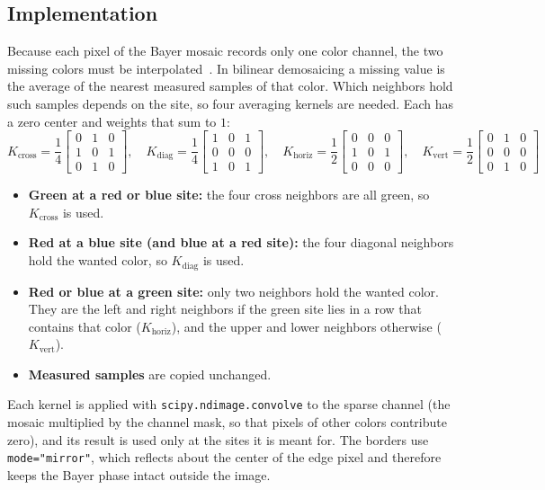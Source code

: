 \documentclass[a4paper]{article}
\begin{document}
\subsection{Implementation}
Because each pixel of the Bayer mosaic records only one color channel, the two missing colors must be interpolated~\cite{malvar2004demosaicing}. In bilinear demosaicing a missing value is the average of the nearest measured samples of that color. Which neighbors hold such samples depends on the site, so four averaging kernels are needed. Each has a zero center and weights that sum to $1$:
\begin{equation}
    K_{\text{cross}} = \frac{1}{4}\begin{bmatrix} 0 & 1 & 0 \\ 1 & 0 & 1 \\ 0 & 1 & 0 \end{bmatrix}, \quad
    K_{\text{diag}} = \frac{1}{4}\begin{bmatrix} 1 & 0 & 1 \\ 0 & 0 & 0 \\ 1 & 0 & 1 \end{bmatrix}, \quad
    K_{\text{horiz}} = \frac{1}{2}\begin{bmatrix} 0 & 0 & 0 \\ 1 & 0 & 1 \\ 0 & 0 & 0 \end{bmatrix}, \quad
    K_{\text{vert}} = \frac{1}{2}\begin{bmatrix} 0 & 1 & 0 \\ 0 & 0 & 0 \\ 0 & 1 & 0 \end{bmatrix}
\end{equation}
\begin{itemize}
    \item \textbf{Green at a red or blue site:} the four cross neighbors are all green, so $K_{\text{cross}}$ is used.
    \item \textbf{Red at a blue site (and blue at a red site):} the four diagonal neighbors hold the wanted color, so $K_{\text{diag}}$ is used.
    \item \textbf{Red or blue at a green site:} only two neighbors hold the wanted color. They are the left and right neighbors if the green site lies in a row that contains that color ($K_{\text{horiz}}$), and the upper and lower neighbors otherwise ($K_{\text{vert}}$).
    \item \textbf{Measured samples} are copied unchanged.
\end{itemize}
Each kernel is applied with \texttt{scipy.ndimage.convolve} to the sparse channel (the mosaic multiplied by the channel mask, so that pixels of other colors contribute zero), and its result is used only at the sites it is meant for. The borders use \texttt{mode="mirror"}, which reflects about the center of the edge pixel and therefore keeps the Bayer phase intact outside the image.
\end{document}
